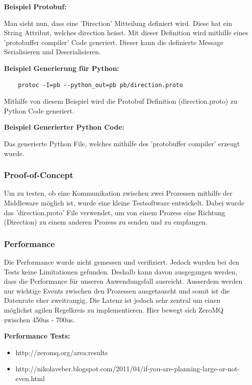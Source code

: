 \documentclass[../../main.tex]{subfiles}
\begin{document}
\textbf{Beispiel Protobuf:}

Man sieht nun, dass eine 'Direction' Mitteilung definiert wird. Diese hat ein String Attribut, welches direction heisst. Mit dieser Definition
wird mithilfe eines 'protobuffer compiler' Code generiert. Dieser kann die definierte Message Serialisieren und Deserialisieren.

\textbf{Beispiel Generierung für Python:}
\begin{lstlisting}
    protoc -I=pb --python_out=pb pb/direction.proto
\end{lstlisting}
Mithilfe von diesem Beispiel wird die Protobuf Definition (direction.proto) zu Python Code generiert.

\textbf{Beispiel Generierter Python Code:}

Das generierte Python File, welches mithilfe des 'protobuffer compiler' erzeugt wurde.

\subsubsection{Proof-of-Concept}
Um zu testen, ob eine Kommunikation zwischen zwei Prozessen mithilfe der Middleware möglich ist, wurde eine kleine Testsoftware entwickelt.
Dabei wurde das 'direction.proto' File verwendet, um von einem Prozess eine Richtung (Direction) zu einem anderen
Prozess zu senden und zu empfangen.

\subsubsection{Performance}
Die Performance wurde nicht gemessen und verifiziert. Jedoch wurden bei den Tests keine Limitationen gefunden. Deshalb kann davon ausgegangen werden,
dass die Performance für unseren Anwendungsfall ausreicht. Ausserdem werden nur wichtige Events zwischen den Prozessen ausgetauscht und somit ist die Datenrate
eher zweitrangig. Die Latenz ist jedoch sehr zentral um einen möglichst agilen Regelkreis zu implementieren. Hier bewegt sich ZeroMQ zwischen 450us - 700us.

\textbf{Performance Tests:}
\begin{itemize}
    \item http://zeromq.org/area:results
    \item http://nikolaveber.blogspot.com/2011/04/if-you-are-planning-large-or-not-even.html
\end{itemize}
\end{document}
